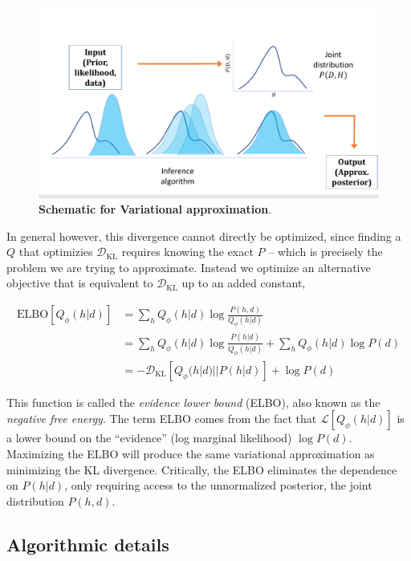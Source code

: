 \begin{figure}
\centering
\includegraphics[width = \textwidth]{figures/variational_schematic.pdf}
\caption{\textbf{Schematic for Variational approximation}. }
\label{fig:var_schematic}
\end{figure}

In general however, this divergence cannot directly be optimized, since finding a $Q$ that optimizies $\mathcal{D}_{\text{KL}}$ requires knowing the exact $P$ -- which is precisely the problem we are trying to approximate. Instead we optimize an alternative objective that is equivalent to $\mathcal{D}_{\text{KL}}$ up to an added constant,

\begin{align}
\text{ELBO}[Q_\phi(h|d)] &=  \sum_h Q_\phi(h|d) \log \frac{P(h,d)}{Q_\phi(h|d)}  \nonumber \\
& = \sum_h Q_\phi(h|d) \log \frac{P(h|d)}{Q_\phi(h|d)} + \sum_h Q_\phi(h|d) \log P(d)  \nonumber \\
& = - \mathcal{D}_{\text{KL}}[Q_\phi(h|d)||P(h|d)]  + \log P(d)
\label{eq:ELBO}
\end{align}

This function is called the \emph{evidence lower bound} (ELBO), also known as the \emph{negative free energy}. The term ELBO comes from the fact that $\mathcal{L}[Q_\phi(h|d)]$ is a lower bound on the ``evidence'' (log marginal likelihood) $\log P(d)$. Maximizing the ELBO will produce the same variational approximation as minimizing the KL divergence. Critically, the ELBO eliminates the dependence on $P(h|d)$, only requiring access to the unnormalized posterior, the joint distribution $P(h,d)$.


\subsection{Algorithmic details}
\label{sec:var_alg}

